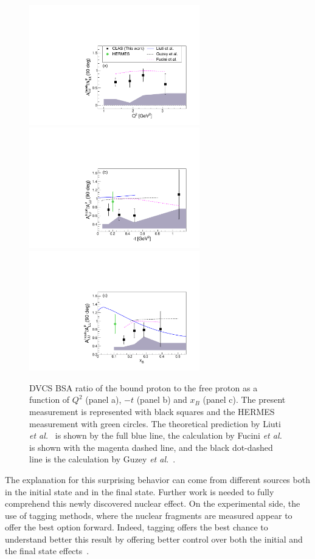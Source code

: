\documentclass[aps,prc,preprint,superscriptaddress]{revtex4}
\begin{document}
\begin{figure}[tbp!]
\center
\includegraphics[width=7.4cm]{ALU_ratioInc_Q2_shortscenrario.pdf}
\includegraphics[width=7.4cm]{ALU_ratioInc_t_shortscenrario.pdf}
\includegraphics[width=7.4cm]{ALU_ratioInc_x_shortscenrario.pdf}
	\caption{DVCS BSA ratio of the bound proton to the free proton as a function of 
	$Q^2$ (panel a), $-t$ (panel b) and $x_B$ (panel c). The present measurement is 
	represented with black squares and the HERMES 
	measurement \cite{Airapetian:2009cga} with green circles. The theoretical prediction
	by Liuti {\it et al.}~\cite{Liuti:2005gi,GonzalezHernandez:2012jv} is shown 
	by the full blue line, the calculation by Fucini 
	{\it et al.}~\cite{Fucini:2019xlc} is shown with the magenta dashed line, and 
	the black dot-dashed line is the calculation by Guzey {\it et al.}~\cite{Guzey:2008th}.}
\label{fig:IncRatios}
\end{figure}

The explanation for this surprising behavior can come from different sources
both in the initial state and in the final state. 
Further work is needed to fully comprehend this newly discovered nuclear effect. On the 
experimental side, the use of tagging methods, where the nuclear fragments are measured
appear to offer the best option forward. Indeed, tagging offers the best chance to understand better
this result by offering better control over both the initial and the final state 
effects~\cite{Dupre:2015jha}.
\end{document}
